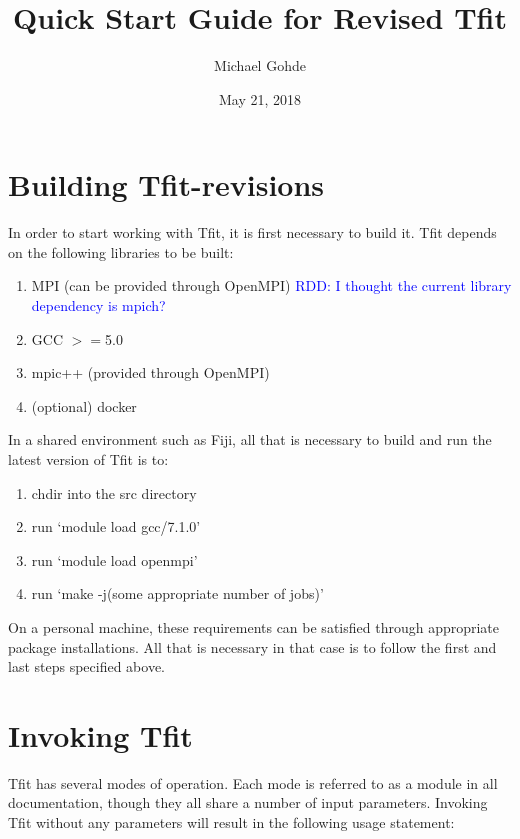 \documentclass[12pt,letterpaper]{article}
\begin{document}
\title{Quick Start Guide for Revised Tfit}
\author{Michael Gohde}
\date{May 21, 2018}
\maketitle


\section{Building Tfit-revisions}
In order to start working with Tfit, it is first necessary to build it. Tfit depends on the following libraries to be built:

\begin{enumerate}
\item MPI (can be provided through OpenMPI)  \textcolor{blue}{RDD: I thought the current library dependency is mpich?}
\item GCC $>=$5.0
\item mpic++ (provided through OpenMPI)
\item (optional) docker
\end{enumerate}

In a shared environment such as Fiji, all that is necessary to build and run the latest version of Tfit is to:
\begin{enumerate}
\item chdir into the src directory
\item run `module load gcc/7.1.0'
\item run `module load openmpi'
\item run `make -j(some appropriate number of jobs)'
\end{enumerate}

On a personal machine, these requirements can be satisfied through appropriate package installations. All that is necessary in that case is to follow the first and last steps specified above.

\section{Invoking Tfit}
Tfit has several modes of operation. Each mode is referred to as a module in all documentation, though they all share a number of input parameters. 
Invoking Tfit without any parameters will result in the following usage statement: 
\end{document}
